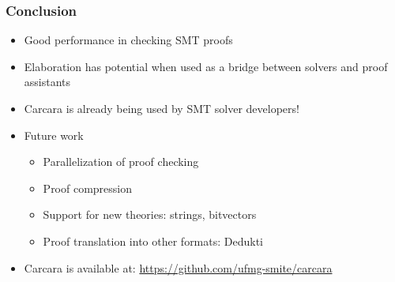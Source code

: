 \documentclass[usepdftitle=false,aspectratio=169]{beamer}
\newcommand\vitem{\vfill\item}
\begin{document}
\begin{frame}
  \frametitle{Conclusion}

  \begin{itemize}
    \item Good performance in checking SMT proofs
    \vitem Elaboration has potential when used as a bridge between solvers and
    proof assistants
    \vitem Carcara is already being used by SMT solver developers!
    \vitem Future work
    \begin{itemize}
      \item Parallelization of proof checking
      \item Proof compression
      \item Support for new theories: strings, bitvectors
      \item Proof translation into other formats: Dedukti
    \end{itemize}
    \vitem Carcara is available at: \url{https://github.com/ufmg-smite/carcara}
  \end{itemize}
\end{frame}

\maketitle
\end{document}
